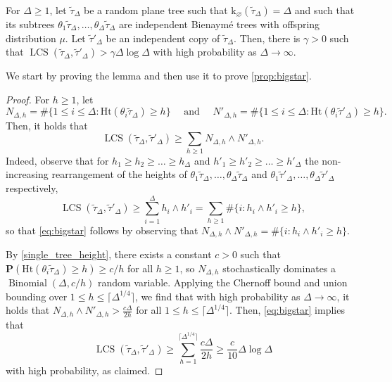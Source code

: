 \documentclass[11pt,reqno]{amsart}
\newcommand{\1}{\mathbf{1}}
\newcommand{\0}{\mathbf{0}}
\newcommand{\prob}{\mathbf{P}}
\newcommand{\Ht}{\mathrm{Ht}}
\newcommand{\rk}{\mathrm{k}}
\newcommand{\LCS}{\operatorname{LCS}}
\begin{document}
\begin{lem}\label{lem:bigstar}
For $\Delta\ge 1$, let $\tilde{\tau}_\Delta$ be a random plane tree such that $\rk_\varnothing(\tilde{\tau}_\Delta)=\Delta$ and such that its subtrees $\theta_1\tilde{\tau}_\Delta,\ldots,\theta_{\Delta}\tilde{\tau}_\Delta$ are independent Bienaymé trees with offspring distribution $\mu$. Let $\tilde{\tau}'_\Delta$ be an independent copy of $\tilde{\tau}_\Delta$. 
Then, there is $\gamma > 0$ such that 
$\LCS(\tilde{\tau}_\Delta,\tilde{\tau}'_\Delta)>\gamma \Delta \log \Delta$ with high probability as $\Delta\to\infty$. 
\end{lem}
We start by proving the lemma and then use it to prove \cref{prop:bigstar}.
\begin{proof}
For $h\ge 1$, let \[N_{\Delta,h}=\#\{1\le i\le \Delta :\Ht(\theta_i\tilde{\tau}_\Delta)\ge h\}\quad \text{ and }\quad N'_{\Delta,h}=\#\{1\le i\le \Delta :\Ht(\theta_i\tilde{\tau}'_\Delta)\ge h\}.\]
Then, it holds that 
\begin{equation}\label{eq:bigstar}
\LCS(\tilde{\tau}_\Delta,\tilde{\tau}'_\Delta)
\ge \sum_{h\ge 1} 
N_{\Delta,h}\wedge N'_{\Delta,h}.
\end{equation}
Indeed, observe that for $h_1\ge h_2\ge\dots \ge h_\Delta$ and $h'_1\ge h'_2\ge\dots \ge h'_\Delta$ the non-increasing rearrangement of the heights of $\theta_1\tilde{\tau}_\Delta,\dots ,\theta_\Delta\tilde{\tau}_\Delta$ and $\theta_1\tilde{\tau}'_\Delta,\dots ,\theta_\Delta\tilde{\tau}'_\Delta$ respectively,
\[\LCS(\tilde{\tau}_\Delta,\tilde{\tau}'_\Delta)\ge \sum_{i=1}^\Delta h_i\wedge h'_i=\sum_{h\ge 1}\#\{i: h_i\wedge h'_i\ge h\},\]
so that \eqref{eq:bigstar} follows by observing that $N_{\Delta,h}\wedge N'_{\Delta,h}=\#\{i: h_i\wedge h'_i\ge h\}$. 

By \cref{single_tree_height}, there exists a constant $c>0$ such that  $\prob(\Ht(\theta_i\tilde{\tau}_\Delta)\ge h)\ge c/h$ for all $h\geq 1$, so $N_{\Delta,h}$ stochastically dominates a $\operatorname{Binomial}(\Delta, c/h)$ random variable. Applying the Chernoff bound and union bounding over $1\le h \le \lceil \Delta^{1/4}\rceil$, we find that with high probability as $\Delta\to\infty$, it holds that $N_{\Delta,h}\wedge N'_{\Delta,h}>\frac{c\Delta}{2h}$ for all $1\le h\le \lceil \Delta^{1/4}\rceil $. Then, \eqref{eq:bigstar} implies that  
\[\LCS(\tilde{\tau}_\Delta,\tilde{\tau}'_\Delta)
\ge \sum_{h=1}^{\lceil \Delta^{1/4}\rceil} \frac{c\Delta}{2h}\ge \frac{c}{10}\Delta\log \Delta 
\]
with high probability, as claimed. 
\end{proof}
\end{document}
